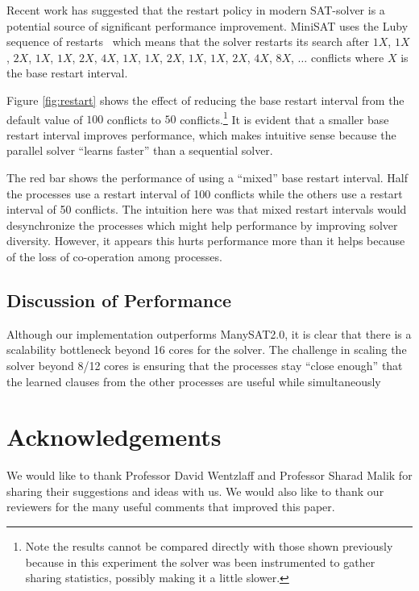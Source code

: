 \documentclass[letterpaper, compsoc, conference]{IEEEtran}
\begin{document}
Recent work \cite{HuangRestart2007} has suggested that the restart policy in
modern SAT-solver is a potential source of significant performance improvement.
MiniSAT uses the Luby sequence of restarts~\cite{Luby93optimalspeedup}
which means that the solver restarts its search after $1X$, $1X$, $2X$, $1X$, $1X$,
$2X$, $4X$, $1X$, $1X$, $2X$, $1X$, $1X$, $2X$, $4X$, $8X$, $\dots$ conflicts
where $X$ is the base restart interval. 

Figure \ref{fig:restart} shows the effect of reducing the base restart interval
from the default value of $100$ conflicts to $50$ conflicts.\footnote{Note the
results cannot be compared directly with those shown previously because in this
experiment the solver was been instrumented to gather sharing statistics,
possibly making it a little slower.} It is evident that a smaller base restart
interval improves performance, which makes intuitive sense because the parallel
solver ``learns faster'' than a sequential solver. 

The red bar shows the performance of using a ``mixed'' base restart interval.
Half the processes use a restart interval of 100 conflicts while the others use a
restart interval of 50 conflicts. The intuition here was that mixed restart
intervals would desynchronize the processes which might help performance by
improving solver diversity. However, it appears this hurts performance more
than it helps because of the loss of co-operation among processes.

\subsection{Discussion of Performance}

Although our implementation outperforms ManySAT2.0, it is clear that there is
a scalability bottleneck beyond 16 cores for the solver. The challenge in
scaling the solver beyond 8/12 cores is ensuring that the processes
stay ``close enough'' that the learned clauses from the other processes
are useful while simultaneously 

\section*{Acknowledgements}

We would like to thank Professor David Wentzlaff and Professor Sharad Malik for
sharing their suggestions and ideas with us. We would also like to thank our
reviewers for the many useful comments that improved this paper.
\end{document}
